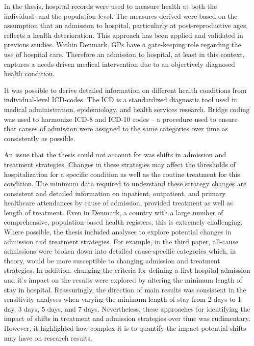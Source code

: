 In the thesis, hospital records were used to measure health at both 
the individual- and the population-level. The measures derived were 
based on the assumption that an admission to hospital, particularly 
at post-reproductive ages, reflects a health deterioration. This approach 
has been applied and validated in previous studies.\citep{hanlon1998hospital,
hanlon2000link,dixon2004hospital,case2005sex,hanlon2007analysis,
karampampa2013trends,syddall2016understanding,luben2016predicting,
hu2018changes,westergaard2019population} Within Denmark, GPs have a 
gate-keeping role regarding the use of hospital care.\citep{sahl2011danish,
juul2012denmark,pedersen2012general} Therefore an admission to hospital, 
at least in this context, captures a needs-driven medical intervention 
due to an objectively diagnosed health condition. 

It was possible to derive detailed information on different health 
conditions from individual-level ICD-codes. The ICD is a standardized 
diagnostic tool used in medical administration, epidemiology, and 
health services research.\citep{who2016} Bridge coding was used to 
harmonize ICD-8 and ICD-10 codes -- a procedure used to ensure that 
causes of admission were assigned to the same categories over time 
as consistently as possible.\citep{rooney2002implementation,janssen2004icd}


An issue that the thesis could not account for was shifts in admission 
and treatment strategies. Changes in these strategies may affect the 
thresholds of hospitalization for a specific condition as well as the 
routine treatment for this condition. The minimum data required to 
understand these strategy changes are consistent and detailed information 
on inpatient, outpatient, and primary healthcare attendances by cause of 
admission, provided treatment as well as length of treatment. Even in 
Denmark, a country with a large number of comprehensive, population-based 
health registers, this is extremely challenging. Where possible, the thesis 
included analyses to explore potential changes in admission and treatment 
strategies. For example, in the third paper, all-cause admissions were 
broken down into detailed cause-specific categories which, in theory, 
would be more susceptible to changing admission and treatment strategies. 
In addition, changing the criteria for defining a first hospital admission 
and it's impact on the results were explored by altering the minimum length 
of stay in hospital. Reassuringly, the direction of main results was consistent 
in the sensitivity analyses when varying the minimum length of stay from 2 
days to 1 day, 3 days, 5 days, and 7 days. Nevertheless, these approaches 
for identifying the impact of shifts in treatment and admission strategies 
over time was rudimentary. However, it highlighted how complex it is to 
quantify the impact potential shifts may have on research results.

